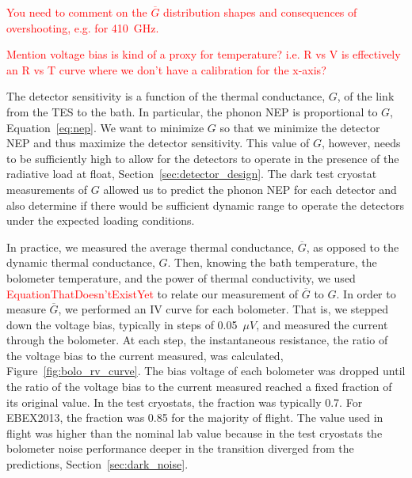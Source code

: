 \textcolor{red}{You need to comment on the $\overline{G}$ distribution shapes and consequences of overshooting, e.g. for 410~GHz.}

\textcolor{red}{Mention voltage bias is kind of a proxy for temperature? i.e. R vs V is effectively an R vs T curve where we don't have a calibration for the x-axis?}

The detector sensitivity is a function of the thermal conductance, $G$, of the link from the TES to the bath. %
In particular, the phonon \ac{NEP} is proportional to $G$, Equation~\ref{eq:nep}. 
We want to minimize $G$ so that we minimize the detector \ac{NEP} and thus maximize the detector sensitivity. 
This value of $G$, however, needs to be sufficiently high to allow for the detectors to operate in the presence of the radiative load at float, Section~\ref{sec:detector_design}. 
The dark test cryostat measurements of $G$ allowed us to predict the phonon \ac{NEP} for each detector and also determine if there would be sufficient dynamic range to operate the detectors under the expected loading conditions. 

In practice, we measured the average thermal conductance, $\overline G$, as opposed to the dynamic thermal conductance, $G$.
Then, knowing the bath temperature, the bolometer temperature, and the power of thermal conductivity, we used \textcolor{red}{EquationThatDoesn'tExistYet} to relate our measurement of $\overline G$ to $G$. 
In order to measure $\overline G$, we performed an IV curve for each bolometer.
That is, we stepped down the voltage bias, typically in steps of 0.05~$\mu V$, and measured the current through the bolometer. 
At each step, the instantaneous resistance, the ratio of the voltage bias to the current measured, was calculated, Figure~\ref{fig:bolo_rv_curve}. 
The bias voltage of each bolometer was dropped until the ratio of the voltage bias to the current measured reached a fixed fraction of its original value.
In the test cryostats, the fraction was typically 0.7. 
For \ac{EBEX2013}, the fraction was 0.85 for the majority of flight.
The value used in flight was higher than the nominal lab value because in the test cryostats the bolometer noise performance deeper in the transition diverged from the predictions, Section~\ref{sec:dark_noise}. 

